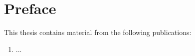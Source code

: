 
\chapter{Preface}

This thesis contains material from the following publications:

\begin{enumerate}
    \item ...
\end{enumerate}

